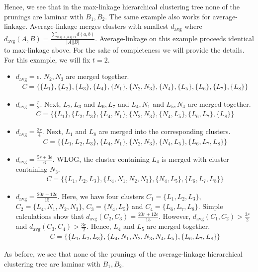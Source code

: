 \documentclass[12pt]{article}
\DeclareMathOperator{\avg}{avg}
\begin{document}
Hence, we see that in the max-linkage hierarchical clustering tree none of the prunings are laminar with ${B_1, B_2}$. The same example also works for average-linkage. Average-linkage merges clusters with smallest $d_{\avg}$ where $d_{\avg}(A, B) = \frac{\sum_{a \in A, b \in B} d(a, b)}{|A||B|}$. Average-linkage on this example proceeds identical to max-linkage above. For the sake of completeness we will provide the details. For this example, we will fix $t = 2$. 

\begin{itemize}[nolistsep] 
\item $d_{\avg} = \epsilon$. $N_2, N_3$ are merged together. 
\vspace{-0.1in}\begin{align*}
C = \{\{L_1\},\{L_2\},\{L_3\},\{L_4\},\{N_1\},\{N_2,N_3\},\{N_4\},\{L_5\},\{L_6\},\{L_7\},\{L_8\}\}
\end{align*}
\item \vspace{-0.1in} $d_{\avg} = \frac{r}{2}$. Next, $L_2, L_3$ and $L_6, L_7$ and $L_4, N_1$ and $L_5, N_4$ are merged together. 
\vspace{-0.1in}\begin{align*}
C = \{\{L_1\},\{L_2,L_3\},\{L_4, N_1\},\{N_2,N_3\},\{N_4, L_5\},\{L_6, L_7\},\{L_8\}\}
\end{align*}
\item \vspace{-0.1in} $d_{\avg} = \frac{3r}{4}$. Next, $L_1$ and $L_8$ are merged into the corresponding clusters. 
\vspace{-0.3in}\begin{align*}
C = \{\{L_1, L_2,L_3\},\{L_4, N_1\},\{N_2,N_3\},\{N_4, L_5\},\{L_6, L_7, L_8\}\}
\end{align*}
\item \vspace{-0.1in} $d_{\avg} = \frac{5r+3\epsilon}{6}$. WLOG, the cluster containing $L_4$ is merged with cluster containing $N_3$. 
\vspace{-0.1in}\begin{align*}
C = \{\{L_1, L_2,L_3\},\{L_4, N_1, N_2,N_3\},\{N_4, L_5\},\{L_6, L_7, L_8\}\}
\end{align*}
\item \vspace{-0.1in} $d_{\avg} = \frac{20r+12\epsilon}{15}$. Here, we have four clusters $C_1 = \{L_1, L_2,L_3\}$, $C_2 = \{L_4, N_1, N_2,N_3\}$, $C_3 = \{N_4, L_5\}$ and $C_4 = \{L_6, L_7, L_8\}$. Simple calculations show that $d_{\avg}(C_2, C_3) = \frac{20r+12\epsilon}{15}$. However, $d_{\avg}(C_1, C_2) > \frac{3r}{2}$ and $d_{\avg}(C_3, C_4) > \frac{3r}{2}$. Hence, $L_4$ and $L_5$ are merged together.
\vspace{-0.1in}\begin{align*}
C = \{\{L_1, L_2,L_3\},\{L_4, N_1, N_2,N_3, N_4, L_5\},\{L_6, L_7, L_8\}\}
\end{align*}
\end{itemize}

As before, we see that none of the prunings of the average-linkage hierarchical clustering tree are laminar with ${B_1, B_2}$.
\ifdefined\COMPLETE
\else
\end{document}
